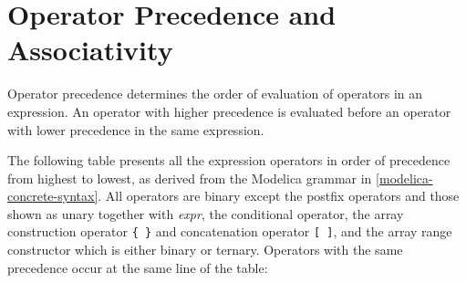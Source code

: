 \section{Operator Precedence and Associativity}

Operator precedence determines the order of evaluation of operators in
an expression. An operator with higher precedence is evaluated before an
operator with lower precedence in the same expression.

The following table presents all the expression operators in order of
precedence from highest to lowest, as derived from the Modelica grammar
in \autoref{modelica-concrete-syntax}. All operators are binary except the postfix operators and
those shown as unary together with \emph{expr}, the conditional
operator, the array construction operator \lstinline!{ }! and concatenation
operator \lstinline![ ]!, and the array range constructor which is either binary
  or ternary. Operators with the same precedence occur at the same line of
the table:
